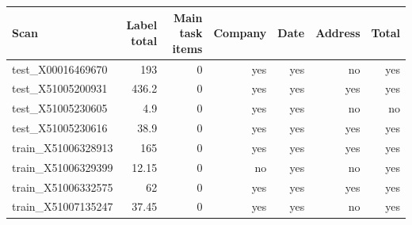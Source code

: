 \begin{tabular}{@{}lrrrrrr@{}}
\toprule
Scan & Label total & Main task items & Company & Date & Address & Total \\
\midrule
test\_X00016469670 & 193 & 0 & yes & yes & no & yes \\
test\_X51005200931 & 436.2 & 0 & yes & yes & yes & yes \\
test\_X51005230605 & 4.9 & 0 & yes & yes & no & no \\
test\_X51005230616 & 38.9 & 0 & yes & yes & yes & yes \\
train\_X51006328913 & 165 & 0 & yes & yes & yes & yes \\
train\_X51006329399 & 12.15 & 0 & no & yes & no & yes \\
train\_X51006332575 & 62 & 0 & yes & yes & yes & yes \\
train\_X51007135247 & 37.45 & 0 & yes & yes & no & yes \\
\bottomrule
\end{tabular}
